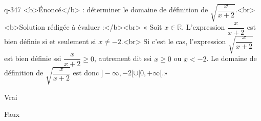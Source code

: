 \begin{truefalse}{q-347}
<b>Énoncé</b> : déterminer le domaine de définition de $\sqrt{\dfrac{x}{x+2}}$.<br> <b>Solution rédigée à évaluer :</b><br>  « Soit $x\in\mathbb{R}$. L'expression $\dfrac{x}{x+2}$ est bien définie si et seulement si $x\neq -2$.<br> Si c'est le cas, l'expression $\sqrt{\dfrac{x}{x+2}}$ est bien définie ssi $\dfrac{x}{x+2}\geq 0$, autrement dit ssi $x\geq 0$ ou $x<-2$. Le domaine de définition de $\sqrt{\dfrac{x}{x+2}}$ est donc $]-\infty,-2[\cup [0,+\infty[$.»
\item* Vrai
\item Faux
\end{truefalse}

